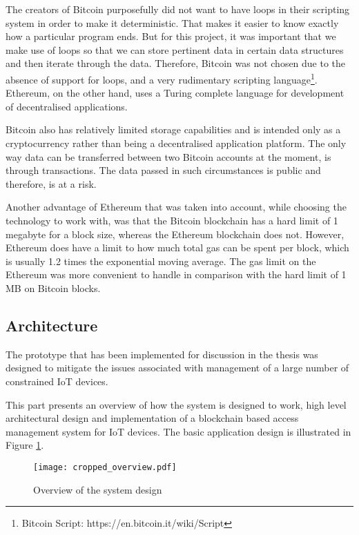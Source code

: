 \documentclass[english]{tktltiki}
\begin{document}
The creators of Bitcoin purposefully did not want to have loops in their scripting system in order to make it deterministic. That makes it easier to know exactly how a particular program ends. But for this project, it was important that we make use of loops so that we can store pertinent data in certain data structures and then iterate through the data. Therefore, Bitcoin was not chosen due to the absence of support for loops, and a very rudimentary scripting language\footnote{Bitcoin Script: https://en.bitcoin.it/wiki/Script}. Ethereum, on the other hand, uses a Turing complete language for development of decentralised applications. 

Bitcoin also has relatively limited storage capabilities and is intended only as a cryptocurrency rather than being a decentralised application platform. The only way data can be transferred between two Bitcoin accounts at the moment, is through transactions. The data passed in such circumstances is public and therefore, is at a risk. 

Another advantage of Ethereum that was taken into account, while choosing the technology to work with, was that the Bitcoin blockchain has a hard limit of 1 megabyte for a block size, whereas the Ethereum blockchain does not. However, Ethereum does have a limit to how much total gas can be spent per block, which is usually 1.2 times the exponential moving average. The gas limit on the Ethereum was more convenient to handle in comparison with the hard limit of 1 MB on Bitcoin blocks.

\subsection{Architecture} 
The prototype that has been implemented for discussion in the thesis was designed to mitigate the issues associated with management of a large number of constrained IoT devices. 

This part presents an overview of how the system is designed to work, high level architectural design and implementation of a blockchain based access management system for IoT devices. The basic application design is illustrated in Figure \ref{system_design}. \newline

\begin{figure}[H]
\begin{center}
\texttt{[image: cropped\_overview.pdf]}
\caption{Overview of the system design}
\label{system_design}
\end{center}
\end{figure}
\end{document}
